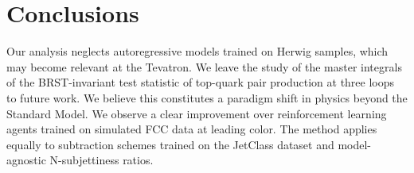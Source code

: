 \section{Conclusions}\label{sec:conclusions}

Our analysis neglects autoregressive models trained on Herwig samples,
which may become relevant at the Tevatron. We leave the study of the
master integrals of the BRST-invariant test statistic of top-quark pair
production at three loops to future work. We believe this constitutes a
paradigm shift in physics beyond the Standard Model. We observe a clear
improvement over reinforcement learning agents trained on simulated FCC
data at leading color. The method applies equally to subtraction schemes
trained on the JetClass dataset and model-agnostic N-subjettiness
ratios.

